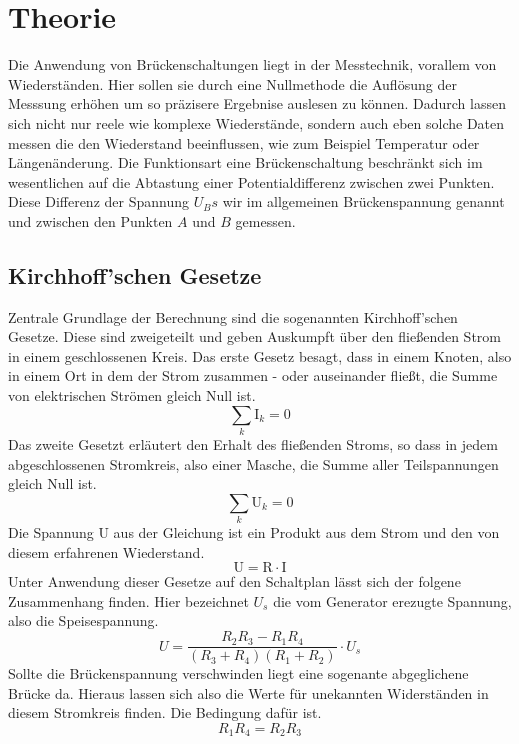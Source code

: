 \section{Theorie}
Die Anwendung von Brückenschaltungen liegt in der Messtechnik,  vorallem von Wiederständen. 
Hier sollen sie durch eine Nullmethode die Auflösung der Messsung erhöhen um so präzisere Ergebnise
auslesen zu können. Dadurch lassen sich nicht nur reele wie komplexe Wiederstände, sondern auch eben 
solche Daten messen die den Wiederstand beeinflussen, wie zum Beispiel Temperatur oder Längenänderung. %
Die Funktionsart eine Brückenschaltung beschränkt sich im wesentlichen auf die Abtastung einer 
Potentialdifferenz zwischen zwei Punkten. 
Diese Differenz der Spannung $U_Bs$ wir im allgemeinen Brückenspannung genannt und zwischen den Punkten $A$ und $B$ gemessen.

\subsection{Kirchhoff'schen Gesetze}
Zentrale Grundlage der Berechnung sind die sogenannten Kirchhoff'schen Gesetze. Diese sind zweigeteilt und 
geben Auskumpft über den fließenden Strom in einem geschlossenen Kreis.
Das erste Gesetz besagt, dass in einem Knoten, also in einem Ort in dem der Strom zusammen - oder auseinander fließt, 
die Summe von elektrischen Strömen gleich Null ist.
\begin{equation}
    \sum_k \text{I}_k = 0
\end{equation}
Das zweite Gesetzt erläutert den Erhalt des fließenden Stroms, so dass in jedem abgeschlossenen Stromkreis, also einer Masche,
die Summe aller Teilspannungen gleich Null ist.
\begin{equation}
    \label{eqn:kirch2}
    \sum_k \text{U}_k = 0
\end{equation}
Die Spannung U aus der Gleichung ist ein Produkt aus dem Strom und den von diesem erfahrenen Wiederstand.
\begin{equation}
    \text{U} = \text{R}\cdot \text{I}
\end{equation}
Unter Anwendung dieser Gesetze auf den Schaltplan %
lässt sich der folgene Zusammenhang finden. Hier bezeichnet $U_s$ die vom Generator erezugte Spannung, also die Speisespannung. 
\begin{equation}
     U= \frac{R_2R_3 - R_1R_4}{(R_3+R_4)(R_1+R_2)}\cdot U_s
\end{equation}
Sollte die Brückenspannung verschwinden liegt eine sogenante abgeglichene Brücke da. 
Hieraus lassen sich also die Werte für unekannten Widerständen in diesem Stromkreis finden.
Die Bedingung dafür ist.
\begin{equation}
    \label{eqn:bedingung}
    R_1 R_4 = R_2 R_3
\end{equation}

